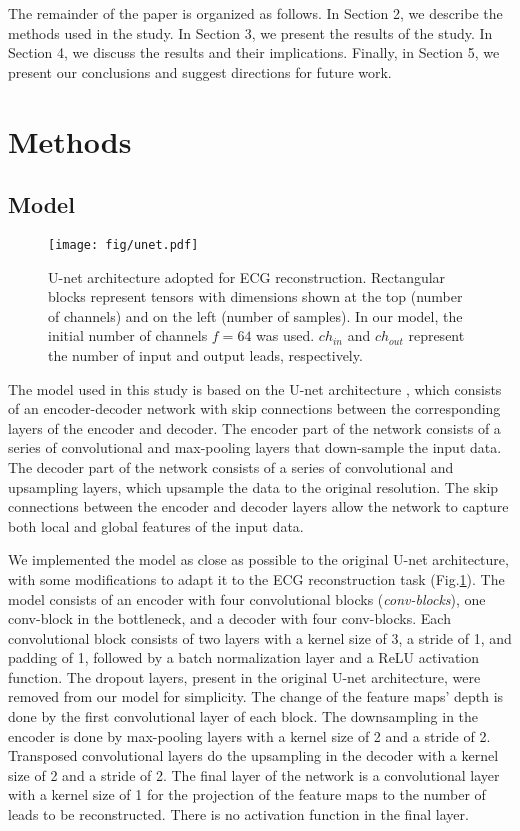 \documentclass[preprint,12pt]{elsarticle}
\begin{document}
The remainder of the paper is organized as follows. In Section 2, we describe the methods used in the study. In Section 3, we present the results of the study. In Section 4, we discuss the results and their implications. Finally, in Section 5, we present our conclusions and suggest directions for future work.


\section{Methods}
\subsection{Model}

\begin{figure}[h]
    \centering
    \texttt{[image: fig/unet.pdf]}
    \caption{U-net architecture adopted for ECG reconstruction. Rectangular blocks represent tensors with dimensions shown at the top (number of channels) and on the left (number of samples). In our model, the initial number of channels $f=64$ was used. $ch_{in}$ and $ch_{out}$ represent the number of input and output leads, respectively.
    }\label{fig:unet}
\end{figure}

The model used in this study is based on the U-net architecture \cite{unet}, which consists of an encoder-decoder network with skip connections between the corresponding layers of the encoder and decoder. The encoder part of the network consists of a series of convolutional and max-pooling layers that down-sample the input data. The decoder part of the network consists of a series of convolutional and upsampling layers, which upsample the data to the original resolution. The skip connections between the encoder and decoder layers allow the network to capture both local and global features of the input data.

We implemented the model as close as possible to the original U-net architecture, with some modifications to adapt it to the ECG reconstruction task (Fig.\ref{fig:unet}). The model consists of an encoder with four convolutional blocks ({\it conv-blocks}), one conv-block in the bottleneck, and a decoder with four conv-blocks. Each convolutional block consists of two layers with a kernel size of 3, a stride of 1, and padding of 1, followed by a batch normalization layer and a ReLU activation function. The dropout layers, present in the original U-net architecture, were removed from our model for simplicity. The change of the feature maps' depth is done by the first convolutional layer of each block. The downsampling in the encoder is done by max-pooling layers with a kernel size of 2 and a stride of 2. Transposed convolutional layers do the upsampling in the decoder with a kernel size of 2 and a stride of 2. The final layer of the network is a convolutional layer with a kernel size of 1 for the projection of the feature maps to the number of leads to be reconstructed. There is no activation function in the final layer.
\end{document}
